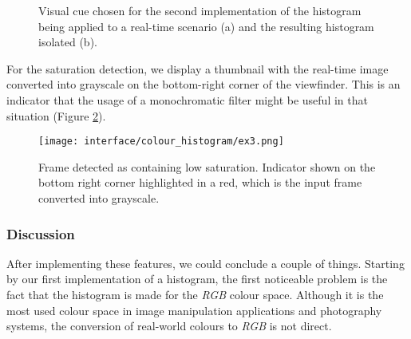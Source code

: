 \begin{figure}[htb]
	\centering
  \caption{Visual cue chosen for the second implementation of the histogram being applied to a real-time scenario (a) and the resulting histogram isolated (b). }
	\label{fig:hist_ex2}
\end{figure}

For the saturation detection, we display a thumbnail with the real-time image converted into grayscale on the bottom-right corner of the viewfinder. This is an indicator that the usage of a monochromatic filter might be useful in that situation (Figure \ref{fig:hist_ex3}).

\begin{figure}[htb]
	\centering
	\texttt{[image: interface/colour\_histogram/ex3.png]}
  	\caption{Frame detected as containing low saturation. Indicator shown on the bottom right corner highlighted in a red, which is the input frame converted into grayscale.}
	\label{fig:hist_ex3}
\end{figure}
  
\subsubsection{Discussion}

After implementing these features, we could conclude a couple of things. Starting by our first implementation of a histogram, the first noticeable problem is the fact that the histogram is made for the \emph{RGB} colour space. Although it is the most used colour space in image manipulation applications and photography systems, the conversion of real-world colours to \emph{RGB} is not direct.

